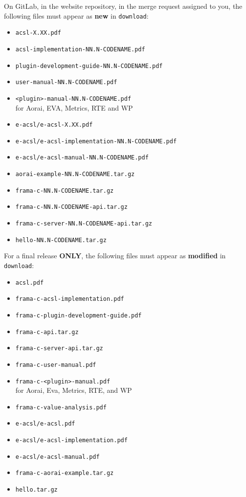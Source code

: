 On GitLab, in the website repository, in the merge request assigned to you, the
following files must appear as \textbf{new} in \texttt{download}:
\begin{itemize}
  \item \texttt{acsl-X.XX.pdf}
  \item \texttt{acsl-implementation-NN.N-CODENAME.pdf}
  \item \texttt{plugin-development-guide-NN.N-CODENAME.pdf}
  \item \texttt{user-manual-NN.N-CODENAME.pdf}
  \item \texttt{<plugin>-manual-NN.N-CODENAME.pdf}\\
        for Aorai, EVA, Metrics, RTE and WP
  \item \texttt{e-acsl/e-acsl-X.XX.pdf}
  \item \texttt{e-acsl/e-acsl-implementation-NN.N-CODENAME.pdf}
  \item \texttt{e-acsl/e-acsl-manual-NN.N-CODENAME.pdf}
  \item \texttt{aorai-example-NN.N-CODENAME.tar.gz}
  \item \texttt{frama-c-NN.N-CODENAME.tar.gz}
  \item \texttt{frama-c-NN.N-CODENAME-api.tar.gz}
  \item \texttt{frama-c-server-NN.N-CODENAME-api.tar.gz}
  \item \texttt{hello-NN.N-CODENAME.tar.gz}
\end{itemize}

For a final release \textbf{ONLY}, the following files must appear as \textbf{modified} in \texttt{download}:

\begin{itemize}
  \item \texttt{acsl.pdf}
  \item \texttt{frama-c-acsl-implementation.pdf}
  \item \texttt{frama-c-plugin-development-guide.pdf}
  \item \texttt{frama-c-api.tar.gz}
  \item \texttt{frama-c-server-api.tar.gz}
  \item \texttt{frama-c-user-manual.pdf}
  \item \texttt{frama-c-<plugin>-manual.pdf}\\
        for Aorai, Eva, Metrics, RTE, and WP
  \item \texttt{frama-c-value-analysis.pdf}
  \item \texttt{e-acsl/e-acsl.pdf}
  \item \texttt{e-acsl/e-acsl-implementation.pdf}
  \item \texttt{e-acsl/e-acsl-manual.pdf}
  \item \texttt{frama-c-aorai-example.tar.gz}
  \item \texttt{hello.tar.gz}
\end{itemize}

